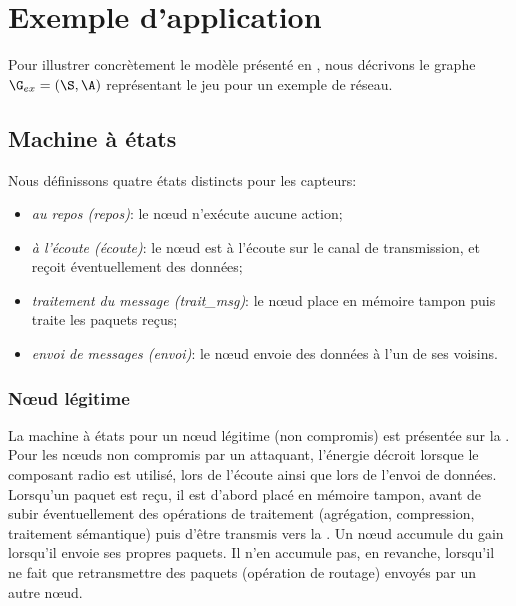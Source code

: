 \section{Exemple d'application}
\label{tj:sec:example}
Pour illustrer concrètement le modèle présenté en , nous décrivons le graphe $\G_{ex} = (\S,\A)$ représentant le jeu pour un exemple de réseau.

    \subsection{Machine à états}

\newcommand\idle         {\textsf{repos}\xspace}
\newcommand\listen       {\textsf{écoute}\xspace}
\newcommand\treatmsg     {\textsf{trait\_msg}\xspace}
\newcommand\treatnlmsg   {\textsf{trait}\\\textsf{msg}\xspace}
\newcommand\send         {\textsf{envoi}\xspace}
\newcommand\resend       {\textsf{renvoi}\xspace}
\newcommand\startsend    {\textsf{déb\_envoi}\xspace}
\newcommand\stopsend     {\textsf{fin\_envoi}\xspace}
\newcommand\startlisten  {\textsf{déb\_écoute}\xspace}
\newcommand\srlisten     {\textsf{déb\_éc.}\xspace}
\newcommand\stoplisten   {\textsf{fin\_écoute}\xspace}
\newcommand\startreceive {\textsf{déb\_réception}\xspace}
\newcommand\starttransmit{\textsf{déb\_retransmission}\xspace}
\newcommand\hold         {\textsf{attente}\xspace}
\newcommand\remainidle   {\textsf{cont\_repos}\xspace}
\newcommand\ignore       {\textsf{ignorer\_msg}\xspace}
Nous définissons quatre états distincts pour les capteurs:
\begin{itemize}
    \item \emph{au repos (\idle)}: le nœud n'exécute aucune action;
    \item \emph{à l'écoute (\listen)}: le nœud est à l'écoute sur le canal de transmission, et reçoit éventuellement des données;
    \item \emph{traitement du message (\treatmsg)}: le nœud place en mémoire tampon puis traite les paquets reçus;
    \item \emph{envoi de messages (\send)}: le nœud envoie des données à l'un de ses voisins.
\end{itemize}

        \subsubsection{Nœud légitime}
La machine à états pour un nœud légitime (non compromis) est présentée sur la .
Pour les nœuds non compromis par un attaquant, l'énergie décroit lorsque le composant radio est utilisé, \cad lors de l'écoute ainsi que lors de l'envoi de données.
Lorsqu'un paquet est reçu, il est d'abord placé en mémoire tampon, avant de subir éventuellement des opérations de traitement (agrégation, compression, traitement sémantique) puis d'être transmis vers la \sdb.
Un nœud accumule du gain lorsqu'il envoie ses propres paquets.
Il n'en accumule pas, en revanche, lorsqu'il ne fait que retransmettre des paquets (opération de routage) envoyés par un autre nœud.

